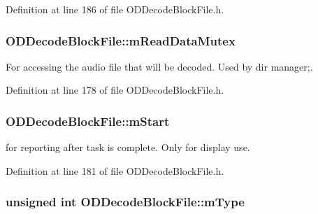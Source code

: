 Definition at line 186 of file O\+D\+Decode\+Block\+File.\+h.

\subsubsection[{\texorpdfstring{m\+Read\+Data\+Mutex}{mReadDataMutex}}]{ O\+D\+Decode\+Block\+File\+::m\+Read\+Data\+Mutex\hspace{0.3cm}{\ttfamily [protected]}}\hypertarget{class_o_d_decode_block_file_a89c35613a3449bff33cf61ece07071c9}{}\label{class_o_d_decode_block_file_a89c35613a3449bff33cf61ece07071c9}


For accessing the audio file that will be decoded. Used by dir manager;. 



Definition at line 178 of file O\+D\+Decode\+Block\+File.\+h.

\subsubsection[{\texorpdfstring{m\+Start}{mStart}}]{ O\+D\+Decode\+Block\+File\+::m\+Start\hspace{0.3cm}{\ttfamily [protected]}}\hypertarget{class_o_d_decode_block_file_affe4ddff8785c296ab698c6062c4f362}{}\label{class_o_d_decode_block_file_affe4ddff8785c296ab698c6062c4f362}


for reporting after task is complete. Only for display use. 



Definition at line 181 of file O\+D\+Decode\+Block\+File.\+h.

\subsubsection[{\texorpdfstring{m\+Type}{mType}}]{\setlength{\rightskip}{0pt plus 5cm}unsigned {\bf int} O\+D\+Decode\+Block\+File\+::m\+Type\hspace{0.3cm}{\ttfamily [protected]}}\hypertarget{class_o_d_decode_block_file_a004fd4c5c3fccc70c801cd08d06fb3be}{}\label{class_o_d_decode_block_file_a004fd4c5c3fccc70c801cd08d06fb3be}


